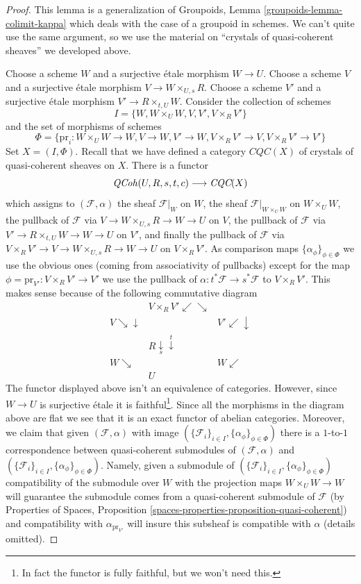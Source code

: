 \begin{proof}
This lemma is a generalization of
Groupoids, Lemma \ref{groupoids-lemma-colimit-kappa}
which deals with the case of a groupoid in schemes.
We can't quite use the same argument, so we use the
material on ``crystals of quasi-coherent sheaves'' we developed above.

\medskip\noindent
Choose a scheme $W$ and a surjective \'etale morphism $W \to U$.
Choose a scheme $V$ and a surjective \'etale morphism
$V \to W \times_{U, s} R$. Choose a scheme $V'$
and a surjective \'etale morphism $V' \to R \times_{t, U} W$.
Consider the collection of schemes
$$
I = \{W, W \times_U W, V, V', V \times_R V'\}
$$
and the set of morphisms of schemes
$$
\Phi = \{\text{pr}_i : W \times_U W \to W, V \to W, V' \to W,
V \times_R V' \to V, V \times_R V' \to V'\}
$$
Set $X = (I, \Phi)$. Recall that we have defined a category $\textit{CQC}(X)$
of crystals of quasi-coherent sheaves on $X$. There is a functor
$$
\mathit{QCoh}(U, R, s, t, c) \longrightarrow \textit{CQC}(X)
$$
which assigns to $(\mathcal{F}, \alpha)$ the sheaf $\mathcal{F}|_W$ on $W$,
the sheaf $\mathcal{F}|_{W \times_U W}$ on $W \times_U W$, the
pullback of $\mathcal{F}$ via $V \to W \times_{U, s} R \to W \to U$
on $V$, the pullback of $\mathcal{F}$ via
$V' \to R \times_{t, U} W \to W \to U$ on $V'$, and finally the
pullback of $\mathcal{F}$ via
$V \times_R V' \to V \to W \times_{U, s} R \to W \to U$ on $V \times_R V'$.
As comparison maps $\{\alpha_\phi\}_{\phi \in \Phi}$
we use the obvious ones (coming from associativity of pullbacks)
except for the map
$\phi = \text{pr}_{V'} : V \times_R V' \to V'$ we use the pullback
of $\alpha : t^*\mathcal{F} \to s^*\mathcal{F}$ to $V \times_R V'$.
This makes sense because of the following commutative diagram
$$
\begin{array}{ccc} & V \times_R V' \swarrow\searrow &  \\ V \searrow\downarrow &  & V' \swarrow\downarrow \\  & R \underset{s}{\downarrow}\overset{t}{\downarrow} &  \\ W \searrow &  & W \swarrow \\  & U & \end{array}
$$
The functor displayed above isn't an equivalence of categories.
However, since $W \to U$ is surjective \'etale it is faithful\footnote{In
fact the functor is fully faithful, but we won't need this.}.
Since all the morphisms in the diagram above are flat we see that
it is an exact functor of abelian categories. Moreover, we
claim that given $(\mathcal{F}, \alpha)$ with image
$(\{\mathcal{F}_i\}_{i \in I}, \{\alpha_\phi\}_{\phi \in \Phi})$
there is a $1$-to-$1$ correspondence between quasi-coherent submodules
of $(\mathcal{F}, \alpha)$ and
$(\{\mathcal{F}_i\}_{i \in I}, \{\alpha_\phi\}_{\phi \in \Phi})$.
Namely, given a submodule of
$(\{\mathcal{F}_i\}_{i \in I}, \{\alpha_\phi\}_{\phi \in \Phi})$
compatibility of the submodule over $W$ with the projection maps
$W \times_U W \to W$ will guarantee the submodule comes from a
quasi-coherent submodule of $\mathcal{F}$ (by
Properties of Spaces, Proposition
\ref{spaces-properties-proposition-quasi-coherent})
and compatibility with $\alpha_{\text{pr}_{V'}}$ will insure this
subsheaf is compatible with $\alpha$ (details omitted).


\end{proof}
